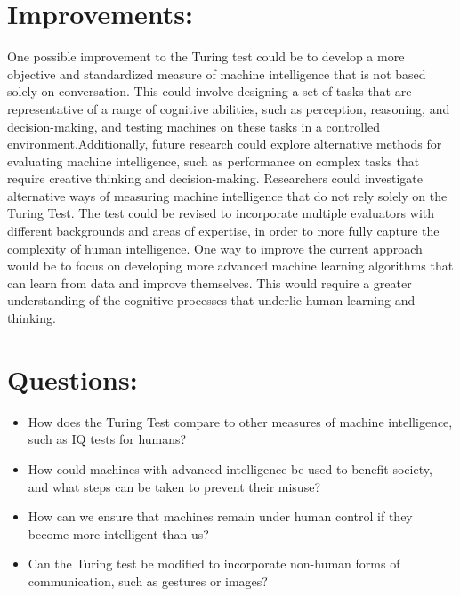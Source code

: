 \documentclass{article}
\begin{document}
\section{Improvements:}
One possible improvement to the Turing test could be to develop a more objective and standardized measure of machine intelligence that is not based solely on conversation. This could involve designing a set of tasks that are representative of a range of cognitive abilities, such as perception, reasoning, and decision-making, and testing machines on these tasks in a controlled environment.Additionally, future research could explore alternative methods for evaluating machine intelligence, such as performance on complex tasks that require creative thinking and decision-making. Researchers could investigate alternative ways of measuring machine intelligence that do not rely solely on the Turing Test. The test could be revised to incorporate multiple evaluators with different backgrounds and areas of expertise, in order to more fully capture the complexity of human intelligence. One way to improve the current approach would be to focus on developing more advanced machine learning algorithms that can learn from data and improve themselves. This would require a greater understanding of the cognitive processes that underlie human learning and thinking.

\section{Questions:}
\begin{itemize}
    \item How does the Turing Test compare to other measures of machine intelligence, such as IQ tests for humans?
\end{itemize}

\begin{itemize}
    \item How could machines with advanced intelligence be used to benefit society, and what steps can be taken to prevent their misuse?
\end{itemize}

\begin{itemize}
\item How can we ensure that machines remain under human control if they become more intelligent than us?
\end{itemize}

\begin{itemize}
\item Can the Turing test be modified to incorporate non-human forms of communication, such as gestures or images? 
\end{itemize}
\end{document}
